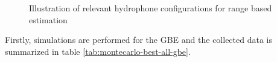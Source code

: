\begin{figure}[!htb]
	\captionsetup{justification=centering,margin=2cm}
	\caption{Illustration of relevant hydrophone configurations for range based estimation}
	\label{fig:config-images}
\end{figure}

Firstly, simulations are performed for the GBE and the collected data is summarized in table \ref{tab:montecarlo-best-all-gbe}.

